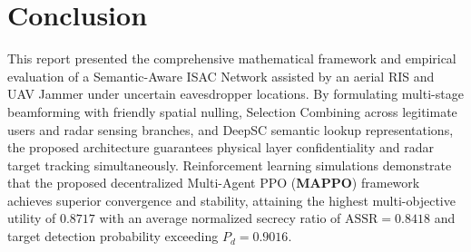 \documentclass[journal,onecolumn]{IEEEtran}
\begin{document}
\section{Conclusion}
This report presented the comprehensive mathematical framework and empirical evaluation of a Semantic-Aware ISAC Network assisted by an aerial RIS and UAV Jammer under uncertain eavesdropper locations. By formulating multi-stage beamforming with friendly spatial nulling, Selection Combining across legitimate users and radar sensing branches, and DeepSC semantic lookup representations, the proposed architecture guarantees physical layer confidentiality and radar target tracking simultaneously. Reinforcement learning simulations demonstrate that the proposed decentralized Multi-Agent PPO (\textbf{MAPPO}) framework achieves superior convergence and stability, attaining the highest multi-objective utility of $\mathbf{0.8717}$ with an average normalized secrecy ratio of $\text{ASSR} = 0.8418$ and target detection probability exceeding $P_d = 0.9016$.


\end{document}
